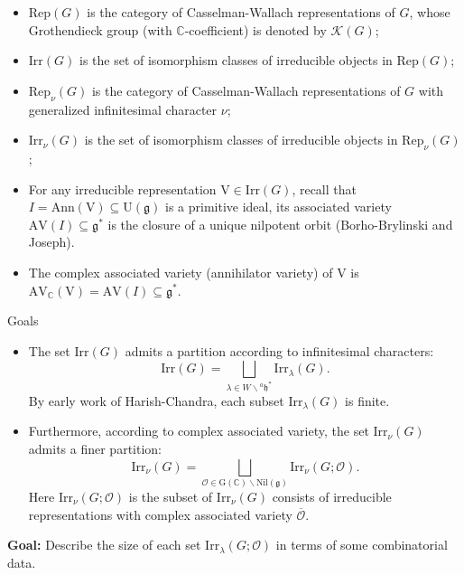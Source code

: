 \documentclass[fleqn,xcolor=dvipsnames]{beamer}
\newcommand{\BC}{{\mathbb {C}}}
\newcommand{\CK}{{\mathcal {K}}}
\newcommand{\CO}{{\mathcal {O}}}
\newcommand{\RG}{{\mathrm {G}}}
\newcommand{\RV}{{\mathrm {V}}}
\newcommand{\fg}{\mathfrak{g}}
\newcommand{\U}{{\mathrm{U}}}
\newcommand{\Irr}{{\mathrm{Irr}}}
\newcommand{\Rep}{{\mathrm{Rep}}}
\newcommand{\Nil}{{\mathrm{Nil}}}
\renewcommand{\bar}{\overline}
\begin{document}
\begin{frame}
  \begin{itemize}
    \item $\mathrm{Rep}(G)$ is the category of Casselman-Wallach representations of $G$, whose Grothendieck group (with $\BC$-coefficient) is denoted by $\CK(G)$;
    \item $\mathrm{Irr}(G)$ is the set of isomorphism classes of irreducible objects in $\mathrm{Rep}(G)$;
    \item $\Rep_{\nu}(G)$ is the category of Casselman-Wallach representations of $G$ with generalized infinitesimal character $\nu$;
    \item $\Irr_{\nu}(G)$ is the set of isomorphism classes of irreducible objects in $\mathrm{Rep}_{\nu}(G)$;
    \item For any irreducible representation $\RV \in \Irr(G)$, recall that $I = \mathrm{Ann}(\RV) \subseteq \U(\fg)$ is a primitive ideal, its associated variety $\mathrm{AV}(I) \subseteq \fg^*$ is the closure of a unique nilpotent orbit (Borho-Brylinski and Joseph).
    \item The complex associated variety (annihilator variety) of $\RV$ is $\mathrm{AV}_{\BC}(\RV) = \mathrm{AV}(I) \subseteq \fg^*$. 
  \end{itemize}
\end{frame}




\begin{frame}{Goals}
  \begin{itemize}
  \item The set \(\Irr(G)\) admits a partition according to infinitesimal characters:
  \[
    \Irr(G) = \bigsqcup\limits_{\lambda \in W \backslash {^{a}\mathfrak{h}}^*} \Irr_{\lambda}(G).
  \]
  By early work of Harish-Chandra, each subset \(\Irr_{\lambda}(G)\) is finite.
  
  \item Furthermore, according to complex associated variety, the set \(\Irr_{\nu}(G)\) admits a finer partition:
  \[
    \Irr_{\nu}(G) = \bigsqcup\limits_{\mathcal{O} \in \RG(\mathbb{C}) \backslash \Nil(\mathfrak{g})} \Irr_{\nu}(G; \mathcal{O}).
  \]
  Here $\Irr_{\nu}(G;\CO)$ is the subset of $\Irr_{\nu}(G)$ consists of irreducible representations with complex associated variety $\bar{\CO}$.
\end{itemize}

\medskip

\noindent
\textbf{Goal:} Describe the size of each set \(\Irr_{\lambda}(G; \mathcal{O})\) in terms of some combinatorial data.
\end{frame}
\end{document}
